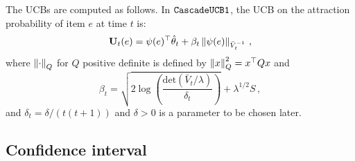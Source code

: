 
The UCBs are computed as follows. In ${\tt CascadeUCB1}$, the UCB on the attraction probability of item $e$ at time $t$ is:
\begin{align*}
  \mathbf{U}_t(e) = \psi(e)^\top \hat{\mathbf{\theta}}_t + \beta_t \left\|\psi(e) \right\|_{\bar{V}_t^{-1}}\,,
\end{align*}
where $\left\|\cdot\right\|_Q$ for $Q$ positive definite is defined by
$\left\|x\right\|^2_Q  = x^\top Q x$ and
\[
\beta_t = \sqrt{2 \log\left(\frac{\mathrm{det}(\bar{V}_t/\lambda)}{\delta_t}\right)} + \lambda^{1/2} S\,,
\]
and $\delta_t = \delta/(t(t+1))$ and $\delta>0$ is a parameter to be chosen later.


\subsection{Confidence interval}

